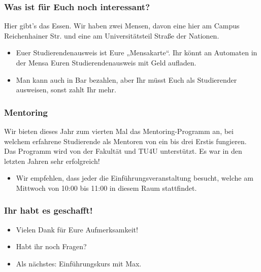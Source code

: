\documentclass[10pt]{beamer}
\begin{document}
\begin{frame}
	\frametitle{Was ist für Euch noch interessant?}

	\begin{block}{\vphantom{X}}
		Hier gibt's das Essen. Wir haben zwei Mensen, davon eine hier am Campus Reichenhainer Str. und eine am Universitätsteil Straße der Nationen.
	\end{block}

	\begin{itemize}
		\item Euer Studierendenausweis ist Eure „Mensakarte“. Ihr könnt an Automaten in der Mensa Euren Studierendenausweis mit Geld aufladen. 
		\item Man kann auch in Bar bezahlen, aber Ihr müsst Euch als Studierender ausweisen, sonst zahlt Ihr mehr.
	\end{itemize}
\end{frame}

\begin{frame}
	\frametitle{Mentoring}

	\begin{block}{\vphantom{X}}
		Wir bieten dieses Jahr zum vierten Mal das Mentoring-Programm an, bei welchem erfahrene Studierende als Mentoren von ein bis drei Erstis fungieren. Das Programm wird von der Fakultät und TU4U unterstützt. Es war in den letzten Jahren sehr erfolgreich!
	\end{block}
	
	\begin{itemize}
		\item Wir empfehlen, dass jeder die Einführungsveranstaltung besucht, welche am Mittwoch von 10:00 bis 11:00 in diesem Raum stattfindet.
	\end{itemize}
\end{frame}

\begin{frame}
	\frametitle{Ihr habt es geschafft!}

	\begin{itemize}
		\item Vielen Dank für Eure Aufmerksamkeit!
		\item Habt ihr noch Fragen? 
		\item Als nächstes: Einführungskurs mit Max.
	\end{itemize}
\end{frame}
\end{document}
